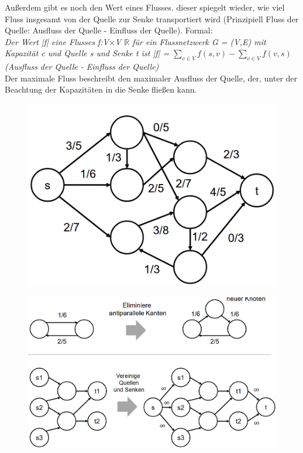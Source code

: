 \documentclass[
../../AuD-Zusammenfassung.tex,
]
{subfiles}
\begin{document}
Außerdem gibt es noch den Wert eines Flusses. dieser spiegelt wieder, wie viel Fluss insgesamt von der Quelle zur Senke transportiert wird (Prinzipiell Fluss der Quelle: Ausfluss der Quelle - Einfluss der Quelle). Formal:\\
\textit{Der Wert |f| eine Flusses f:V$\times$V \rightarrow $\mathbb{R}$ für ein Flussnetzwerk G = (V,E) mit Kapazität c und Quelle s und Senke t ist |f| = $\sum_{v \in V} f(s,v) - \sum_{v \in V} f(v,s)$ (Ausfluss der Quelle - Einfluss der Quelle)}\\
Der maximale Fluss beschreibt den maximaler Ausfluss der Quelle, der, unter der Beachtung der Kapazitäten in die Senke fließen kann.
\begin{figure}[htp]
    \centering
    \includegraphics[scale=0.3]{Pics/Flussgraph.png}
\end{figure}
\begin{figure}[htp]
    \centering
    \includegraphics[scale=0.55]{Pics/FlussTransformationen.png}
\end{figure}
\end{document}
